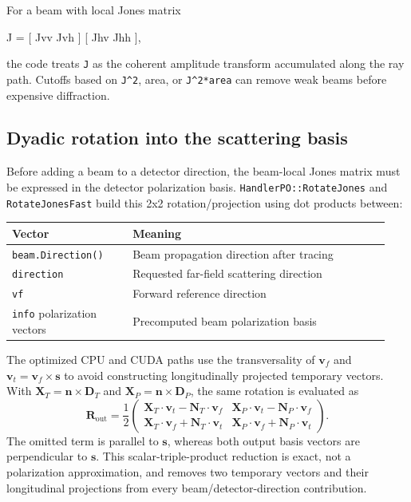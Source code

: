 \documentclass[
  10pt,
  a4paper,
]{article}
\newenvironment{Shaded}{}{}
\newcommand{\NormalTok}[1]{#1}
\begin{document}
For a beam with local Jones matrix

\begin{Shaded}
\begin{Highlighting}[]
\NormalTok{J = [ Jvv  Jvh ]}
\NormalTok{    [ Jhv  Jhh ],}
\end{Highlighting}
\end{Shaded}

the code treats \texttt{J} as the coherent amplitude transform
accumulated along the ray path. Cutoffs based on
\texttt{\textbar{}J\textbar{}\^{}2}, area, or
\texttt{\textbar{}J\textbar{}\^{}2*area} can remove weak beams before
expensive diffraction.

\subsection{Dyadic rotation into the scattering
basis}\label{dyadic-rotation-into-the-scattering-basis}

Before adding a beam to a detector direction, the beam-local Jones
matrix must be expressed in the detector polarization basis.
\texttt{HandlerPO::RotateJones} and \texttt{RotateJonesFast} build this
2x2 rotation/projection using dot products between:

\begin{longtable}[]{@{}L{0.30\linewidth}L{0.64\linewidth}@{}}
\toprule\noalign{}
Vector & Meaning \\
\midrule\noalign{}
\endhead
\bottomrule\noalign{}
\endlastfoot
\texttt{beam.Direction()} & Beam propagation direction after tracing \\
\texttt{direction} & Requested far-field scattering direction \\
\texttt{vf} & Forward reference direction \\
\texttt{info} polarization vectors & Precomputed beam polarization
basis \\
\end{longtable}

The optimized CPU and CUDA paths use the transversality of $\mathbf v_f$ and
$\mathbf v_t=\mathbf v_f\times\mathbf s$ to avoid constructing longitudinally
projected temporary vectors. With
$\mathbf X_T=\mathbf n\times\mathbf D_T$ and
$\mathbf X_P=\mathbf n\times\mathbf D_P$, the same rotation is evaluated as
\[
  \mathbf R_{\mathrm{out}}=\frac12
  \begin{pmatrix}
    \mathbf X_T\cdot\mathbf v_t-\mathbf N_T\cdot\mathbf v_f &
    \mathbf X_P\cdot\mathbf v_t-\mathbf N_P\cdot\mathbf v_f\\
    \mathbf X_T\cdot\mathbf v_f+\mathbf N_T\cdot\mathbf v_t &
    \mathbf X_P\cdot\mathbf v_f+\mathbf N_P\cdot\mathbf v_t
  \end{pmatrix}.
\]
The omitted term is parallel to $\mathbf s$, whereas both output basis vectors
are perpendicular to $\mathbf s$. This scalar-triple-product reduction is exact,
not a polarization approximation, and removes two temporary vectors and their
longitudinal projections from every beam/detector-direction contribution.
\end{document}
